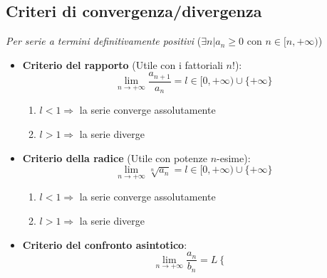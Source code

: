 \documentclass[10pt, a4paper]{article}
\begin{document}
    \subsection{Criteri di convergenza/divergenza}
        \textit{Per serie a termini definitivamente positivi} ($\exists n | a_n\geq 0 \text{ con }n\in[n,+\infty)$)
        \begin{itemize}
            \item \textbf{Criterio del rapporto} (Utile con i fattoriali $n!$): \begin{equation*}
                \lim_{n\rightarrow +\infty}\frac{a_{n+1}}{a_n} = l \in [0,+\infty)\cup\{+\infty\}
            \end{equation*} \begin{enumerate}
                \item $l<1\Rightarrow$ la serie converge assolutamente
                \item $l>1\Rightarrow$ la serie diverge
            \end{enumerate}
            \item \textbf{Criterio della radice} (Utile con potenze $n$-esime): \begin{equation*}
                \lim_{n\rightarrow+\infty}\sqrt[n]{a_n} = l \in [0,+\infty)\cup\{+\infty\}
            \end{equation*} \begin{enumerate}
                \item $l<1\Rightarrow$ la serie converge assolutamente
                \item $l>1\Rightarrow$ la serie diverge
            \end{enumerate}
            \item \textbf{Criterio del confronto asintotico}:
            \begin{equation*}
                \lim_{n\rightarrow +\infty}\frac{a_n}{b_n} = L \begin{cases}

\end{cases}
\end{equation*}
\end{itemize}
\end{document}
